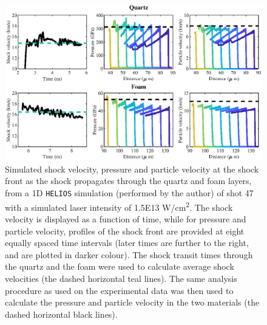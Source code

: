 \begin{figure} [h!]
\begin{centering}
\includegraphics[width=1\textwidth]{figures/Experiment/ShockDecay_wide.eps}%
\caption{\label{fig:ShockDecay} Simulated shock velocity, pressure and particle velocity at the shock front as the shock propagates through the quartz and foam layers, from a 1D \texttt{HELIOS} simulation (performed by the author) of shot 47 with a simulated laser intensity of \num{1.5E13} \si[per-mode=symbol]{W/cm^2}. The shock velocity is displayed as a function of time, while for pressure and particle velocity, profiles of the shock front are provided at eight equally spaced time intervals (later times are further to the right, and are plotted in darker colour). The shock transit times through the quartz and the foam were used to calculate average shock velocities (the dashed horizontal teal lines). The same analysis procedure as used on the experimental data was then used to calculate the pressure and particle velocity in the two materials (the dashed horizontal black lines).}
\end{centering}
\end{figure}

